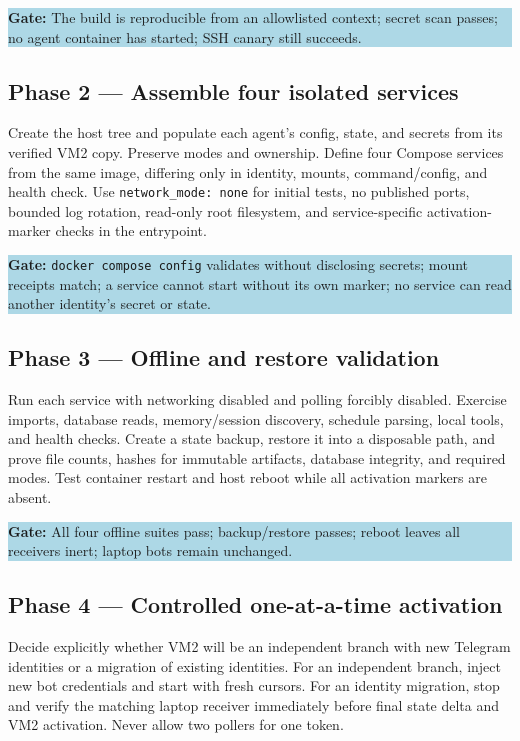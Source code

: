 \documentclass[11pt]{article}
\newcommand{\gate}[1]{\par\medskip\noindent\colorbox{lightblue}{\parbox{0.96\linewidth}{\textbf{Gate:} #1}}\par\medskip}
\begin{document}
\gate{The build is reproducible from an allowlisted context; secret scan passes; no agent container has started; SSH canary still succeeds.}

\subsection*{Phase 2 --- Assemble four isolated services}
Create the host tree and populate each agent's config, state, and secrets from its verified VM2 copy. Preserve modes and ownership. Define four Compose services from the same image, differing only in identity, mounts, command/config, and health check. Use \texttt{network\_mode: none} for initial tests, no published ports, bounded log rotation, read-only root filesystem, and service-specific activation-marker checks in the entrypoint.

\gate{\texttt{docker compose config} validates without disclosing secrets; mount receipts match; a service cannot start without its own marker; no service can read another identity's secret or state.}

\subsection*{Phase 3 --- Offline and restore validation}
Run each service with networking disabled and polling forcibly disabled. Exercise imports, database reads, memory/session discovery, schedule parsing, local tools, and health checks. Create a state backup, restore it into a disposable path, and prove file counts, hashes for immutable artifacts, database integrity, and required modes. Test container restart and host reboot while all activation markers are absent.

\gate{All four offline suites pass; backup/restore passes; reboot leaves all receivers inert; laptop bots remain unchanged.}

\subsection*{Phase 4 --- Controlled one-at-a-time activation}
Decide explicitly whether VM2 will be an independent branch with new Telegram identities or a migration of existing identities. For an independent branch, inject new bot credentials and start with fresh cursors. For an identity migration, stop and verify the matching laptop receiver immediately before final state delta and VM2 activation. Never allow two pollers for one token.
\end{document}

